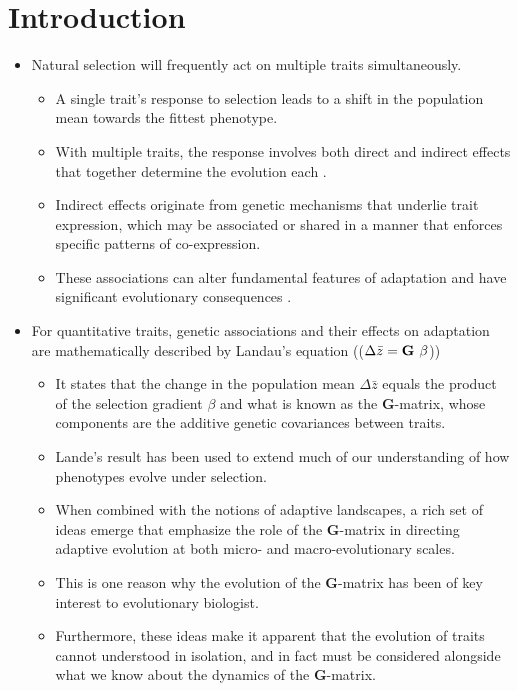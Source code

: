\documentclass[11pt,one column]{article}
\begin{document}
\section*{Introduction}
\begin{itemize}
\item Natural selection will frequently act on multiple traits simultaneously. 
\begin{itemize}
\item A single trait's response to selection leads to a shift in the population mean towards the fittest phenotype.
\item With multiple traits, the response involves both direct and indirect effects that together determine the evolution each \cite{Scarcelli23102007,Lovell2013,Wagner2011}.  
\item Indirect effects originate from genetic mechanisms that underlie trait expression, which may be associated or shared in a manner that enforces specific patterns of co-expression.
\item These associations can alter fundamental features of adaptation and have significant evolutionary consequences \cite{Felsenstein1979, Arnold2001, Arnold2008}.
\end{itemize}

\item For quantitative traits, genetic associations and their effects on adaptation are mathematically described by Landau's equation (($\Delta \bar{z} = \textbf{G} \hspace{.05in}\beta$))
\begin{itemize}	
\item It states that the change in the population mean $\Delta \bar{z}$ equals the product of the selection gradient $\beta$ and what is known as the \textbf{G}-matrix, whose components are the additive genetic covariances between traits.
\item Lande’s result has been used to extend much of our understanding of how phenotypes evolve under selection. 
\item When combined with the notions of adaptive landscapes, a rich set of ideas emerge that emphasize the role of the \textbf{G}-matrix in directing adaptive evolution at both micro- and macro-evolutionary scales.
\item This is one reason why the evolution of the \textbf{G}-matrix has been of key interest to evolutionary biologist. 
\item Furthermore, these ideas make it apparent that the evolution of traits cannot understood in isolation, and in fact must be considered alongside what we know about the dynamics of the \textbf{G}-matrix.
\end{itemize}


\end{itemize}
\end{document}
